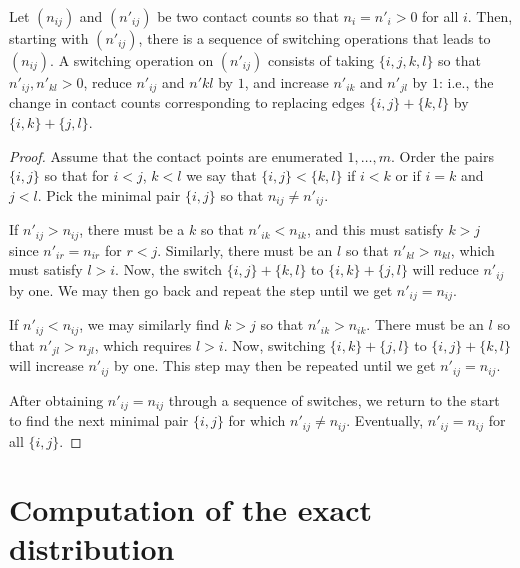 \documentclass{myaptpub}%
\begin{document}
\begin{lemma}\label{lemma:switchConn}
Let $(n_{ij})$ and  $(n'_{ij})$ be two contact counts so that $n_i=n'_i>0$ for all $i$. Then, starting with $(n'_{ij})$, there is a sequence of switching operations that leads to $(n_{ij})$. A switching operation on $(n'_{ij})$ consists of taking $\{i,j,k,l\}$ so that $n'_{ij},n'_{kl}>0$, reduce $n'_{ij}$ and $n'{kl}$ by $1$, and increase $n'_{ik}$ and $n'_{jl}$ by $1$: i.e., the change in contact counts corresponding to replacing edges $\{i,j\}+\{k,l\}$ by $\{i,k\}+\{j,l\}$.
\end{lemma}

\begin{proof}
Assume that the contact points are enumerated $1,\ldots,m$. Order the pairs $\{i,j\}$ so that for $i<j$, $k<l$ we say that $\{i,j\}<\{k,l\}$ if $i<k$ or if $i=k$ and $j<l$. Pick the minimal pair $\{i,j\}$ so that $n_{ij}\not=n'_{ij}$.

If $n'_{ij}>n_{ij}$, there must be a $k$ so that $n'_{ik}<n_{ik}$, and this must satisfy $k>j$ since $n'_{ir}=n_{ir}$ for $r<j$. Similarly, there must be an $l$ so that $n'_{kl}>n_{kl}$, which must satisfy $l>i$. Now, the switch $\{i,j\}+\{k,l\}$ to $\{i,k\}+\{j,l\}$ will reduce $n'_{ij}$ by one. We may then go back and repeat the step until we get $n'_{ij}=n_{ij}$.

If $n'_{ij}<n_{ij}$, we may similarly find $k>j$ so that $n'_{ik}>n_{ik}$. There must be an $l$ so that $n'_{jl}>n_{jl}$, which requires $l>i$. Now, switching $\{i,k\}+\{j,l\}$ to $\{i,j\}+\{k,l\}$ will increase $n'_{ij}$ by one. This step may then be repeated until we get $n'_{ij}=n_{ij}$.

After obtaining $n'_{ij}=n_{ij}$ through a sequence of switches, we return to the start to find the next minimal pair $\{i,j\}$ for which $n'_{ij}\not=n_{ij}$. Eventually, $n'_{ij}=n_{ij}$ for all $\{i,j\}$.
\end{proof}


\section{Computation of the exact distribution}
\end{document}
